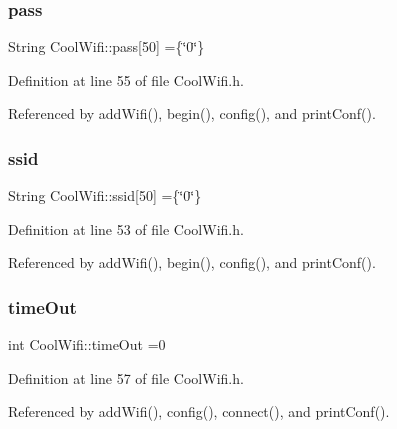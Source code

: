 \subsubsection{\texorpdfstring{pass}{pass}}
{\footnotesize\ttfamily String Cool\+Wifi\+::pass\mbox{[}50\mbox{]} =\{\char`\"{}0\char`\"{}\}\hspace{0.3cm}{\ttfamily [private]}}



Definition at line 55 of file Cool\+Wifi.\+h.



Referenced by add\+Wifi(), begin(), config(), and print\+Conf().

\mbox{\label{classCoolWifi_a893b21d0fed821438733bba2e73fb4c2}} 
\subsubsection{\texorpdfstring{ssid}{ssid}}
{\footnotesize\ttfamily String Cool\+Wifi\+::ssid\mbox{[}50\mbox{]} =\{\char`\"{}0\char`\"{}\}\hspace{0.3cm}{\ttfamily [private]}}



Definition at line 53 of file Cool\+Wifi.\+h.



Referenced by add\+Wifi(), begin(), config(), and print\+Conf().

\mbox{\label{classCoolWifi_a952111605f25156588b5632caaba1c6f}} 
\subsubsection{\texorpdfstring{time\+Out}{timeOut}}
{\footnotesize\ttfamily int Cool\+Wifi\+::time\+Out =0\hspace{0.3cm}{\ttfamily [private]}}



Definition at line 57 of file Cool\+Wifi.\+h.



Referenced by add\+Wifi(), config(), connect(), and print\+Conf().

\mbox{\label{classCoolWifi_ab133bd92fcb895b884deecd6678592e4}} 
